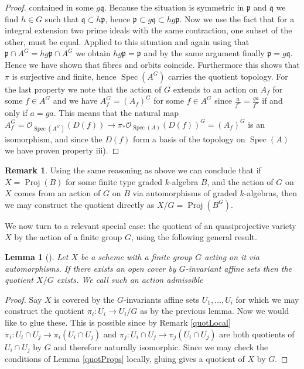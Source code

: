 \documentclass[11pt, a4paper, german]{article}
\theoremstyle{plain}
\newtheorem{lemma}[theorem]{Lemma}
\theoremstyle{definition}
\newtheorem{remark}[theorem]{Remark}
\DeclareMathOperator{\Spec}{Spec}
\DeclareMathOperator{\Proj}{Proj}
\begin{document}
\begin{proof}
    contained in some $g\mathfrak{q}$. Because the situation is symmetric in $\mathfrak{p}$ and $\mathfrak{q}$ we find $h \in G$ such that
    $\mathfrak{q} \subset h\mathfrak{p}$, hence $\mathfrak{p} \subset g\mathfrak{q} \subset hg\mathfrak{p}$. Now we use the fact that
    for a integral extension two prime ideals with the same contraction, one subset of the other, must be equal. Applied to this
    situation and again using that $\mathfrak{p} \cap A^G = hg\mathfrak{p} \cap A^G$ we obtain $hg\mathfrak{p} = \mathfrak{p}$ and by the same
    argument finally $\mathfrak{p} = g\mathfrak{q}$. Hence we have shown that fibres and orbits coincide. Furthermore this shows that $\pi$ is
    surjective and finite, hence $\Spec(A^G)$ carries the quotient topology.
    For the last property we note that the action of $G$ extends to an action on $A_f$ for some $f \in A^G$ and we have 
    $A^G_f = (A_f)^G$ for some $f \in A^G$ since $\frac{a}{f^n} = \frac{ga}{f^n}$ if and only if $a = ga$. This means that the natural
    map $A^G_f = \mathcal{O}_{\Spec(A^G)}(D(f)) \to \pi_*\mathcal{O}_{\Spec(A)}(D(f))^G = (A_f)^G$ is an isomorphism, and since the $D(f)$ form
    a basis of the topology on $\Spec(A)$ we have proven property iii).
\end{proof}

\begin{remark}
    Using the same reasoning as above we can conclude that if $X = \Proj(B)$ for some finite type graded $k$-algebra $B$, 
    and the action of $G$ on $X$ comes from
    an action of $G$ on $B$ via automorphisms of graded $k$-algebras, then we may construct the quotient directly as $X/G = \Proj(B^G)$.
\end{remark}

We now turn to a relevant special case: the quotient of an quasiprojective variety $X$ by the action of a finite group $G$, using the following
general result.

\begin{lemma}[{\cite[Prop. 1.8]{SGA1}}]    
    Let $X$ be a scheme with a finite group $G$ acting on it via automorphisms. If there exists an open cover by $G$-invariant affine sets
    then the quotient $X/G$ exists.
    We call such an action \emph{admissible}
\end{lemma}
\begin{proof}
    Say $X$ is covered by the $G$-invariants affine sets $U_1,\dots,U_i$ for which we may construct the quotient $\pi_i \colon U_i \to U_i/G$ 
    as by the previous lemma. Now we would like to glue these. This is possible since by Remark \ref{quotLocal} 
$\pi_i \colon U_i \cap U_j \to \pi_i(U_i \cap U_j)$ and $\pi_j \colon U_i \cap U_j \to \pi_j(U_i \cap U_j)$ are both quotients of $U_i \cap U_j$
    by $G$ and therefore naturally isomorphic. Since we may check the conditions of Lemma \ref{quotProps} locally, gluing gives a quotient of 
    $X$ by $G$.
\end{proof}
\end{document}
